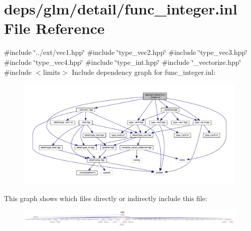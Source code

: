 \hypertarget{func__integer_8inl}{}\section{deps/glm/detail/func\+\_\+integer.inl File Reference}
\label{func__integer_8inl}
{\ttfamily \#include \char`\"{}../ext/vec1.\+hpp\char`\"{}}\newline
{\ttfamily \#include \char`\"{}type\+\_\+vec2.\+hpp\char`\"{}}\newline
{\ttfamily \#include \char`\"{}type\+\_\+vec3.\+hpp\char`\"{}}\newline
{\ttfamily \#include \char`\"{}type\+\_\+vec4.\+hpp\char`\"{}}\newline
{\ttfamily \#include \char`\"{}type\+\_\+int.\+hpp\char`\"{}}\newline
{\ttfamily \#include \char`\"{}\+\_\+vectorize.\+hpp\char`\"{}}\newline
{\ttfamily \#include $<$limits$>$}\newline
Include dependency graph for func\+\_\+integer.\+inl\+:
\nopagebreak
\begin{figure}[H]
\begin{center}
\leavevmode
\includegraphics[width=350pt]{d4/dbe/func__integer_8inl__incl}
\end{center}
\end{figure}
This graph shows which files directly or indirectly include this file\+:
\nopagebreak
\begin{figure}[H]
\begin{center}
\leavevmode
\includegraphics[width=350pt]{d5/dff/func__integer_8inl__dep__incl}
\end{center}
\end{figure}
